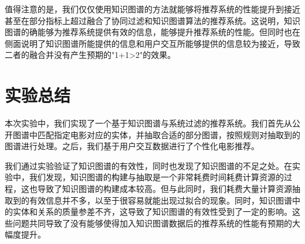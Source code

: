 \documentclass{ctexart}
\begin{document}
\begin{sloppypar}
值得注意的是，我们仅仅使用知识图谱的方法就能够将推荐系统的性能提升到接近甚至在部分指标上超过融合了协同过滤和知识图谱算法的推荐系统。这说明，知识图谱的确能够为推荐系统提供有效的信息，能够提升推荐系统的性能。但同时也在侧面说明了知识图谱所能提供的信息和用户交互所能够提供的信息较为接近，导致二者的融合并没有产生预期的"1+1>2"的效果。

\section{实验总结}
    本次实验中，我们实现了一个基于知识图谱与系统过滤的推荐系统。我们首先从公开图谱中匹配指定电影对应的实体，并抽取合适的部分图谱，按照规则对抽取到的图谱进行处理。之后，我们基于用户交互数据进行了个性化电影推荐。

    我们通过实验验证了知识图谱的有效性，同时也发现了知识图谱的不足之处。在实验中，我们发现，知识图谱的构建与抽取是一个非常耗费时间耗费计算资源的过程，这也导致了知识图谱的构建成本较高。但与此同时，我们耗费大量计算资源抽取到的有效信息并不多，以至于很容易就能出现过拟合的现象。同时，知识图谱中的实体和关系的质量参差不齐，这导致了知识图谱的有效性受到了一定的影响。这些问题共同导致了没有能够使得加入知识图谱数据后的推荐系统的性能有预期的大幅度提升。


\end{sloppypar}
\end{document}
